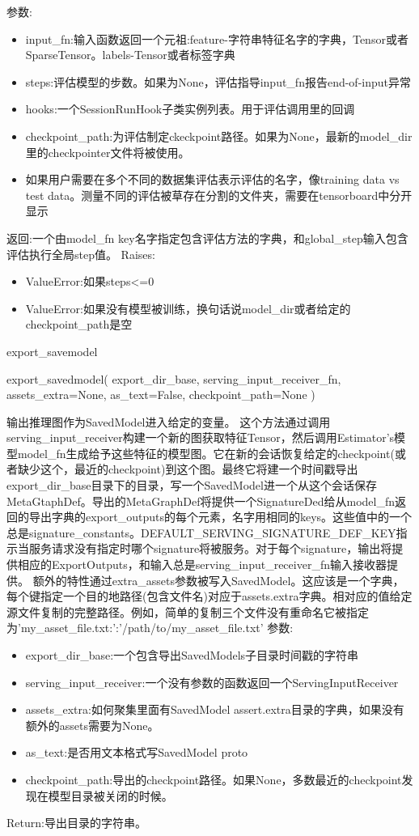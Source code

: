 参数:
\begin{itemize}
	\item input\_fn:输入函数返回一个元祖:feature-字符串特征名字的字典，Tensor或者SparseTensor。labels-Tensor或者标签字典
	\item steps:评估模型的步数。如果为None，评估指导input\_fn报告end-of-input异常
	\item hooks:一个SessionRunHook子类实例列表。用于评估调用里的回调
	\item checkpoint\_path:为评估制定ckeckpoint路径。如果为None，最新的model\_dir里的checkpointer文件将被使用。
	\item 如果用户需要在多个不同的数据集评估表示评估的名字，像training data vs test data。测量不同的评估被草存在分割的文件夹，需要在tensorboard中分开显示
\end{itemize}
返回:一个由model\_fn key名字指定包含评估方法的字典，和global\_step输入包含评估执行全局step值。
Raises:
\begin{itemize}
	\item ValueError:如果steps<=0
	\item ValueError:如果没有模型被训练，换句话说model\_dir或者给定的checkpoint\_path是空
\end{itemize}
export\_savemodel
\begin{python}
export_savedmodel(
    export_dir_base,
    serving_input_receiver_fn,
    assets_extra=None,
    as_text=False,
    checkpoint_path=None
)
\end{python}
输出推理图作为SavedModel进入给定的变量。
这个方法通过调用serving\_input\_receiver构建一个新的图获取特征Tensor，然后调用Estimator's模型model\_fn生成给予这些特征的模型图。它在新的会话恢复给定的checkpoint(或者缺少这个，最近的checkpoint)到这个图。最终它将建一个时间戳导出export\_dir\_base目录下的目录，写一个SavedModel进一个从这个会话保存MetaGtaphDef。导出的MetaGraphDef将提供一个SignatureDed给从model\_fn返回的导出字典的export\_outputs的每个元素，名字用相同的keys。这些值中的一个总是signature\_constants。DEFAULT\_SERVING\_SIGNATURE\_DEF\_KEY指示当服务请求没有指定时哪个signature将被服务。对于每个signature，输出将提供相应的ExportOutputs，和输入总是serving\_input\_receiver\_fn输入接收器提供。
额外的特性通过extra\_assets参数被写入SavedModel。这应该是一个字典，每个键指定一个目的地路径(包含文件名)对应于assets.extra字典。相对应的值给定源文件复制的完整路径。例如，简单的复制三个文件没有重命名它被指定为{'my\_asset\_file.txt:':'/path/to/my\_asset\_file.txt'}
参数:
\begin{itemize}
	\item export\_dir\_base:一个包含导出SavedModels子目录时间戳的字符串
	\item serving\_input\_receiver:一个没有参数的函数返回一个ServingInputReceiver
	\item assets\_extra:如何聚集里面有SavedModel assert.extra目录的字典，如果没有额外的assets需要为None。
	\item as\_text:是否用文本格式写SavedModel proto
	\item checkpoint\_path:导出的checkpoint路径。如果None，多数最近的checkpoint发现在模型目录被关闭的时候。
\end{itemize}
Return:导出目录的字符串。

